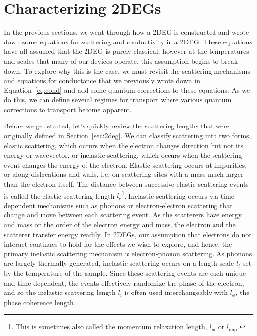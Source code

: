 \section{Characterizing 2DEGs}
\label{sec:char}
In the previous sections, we went through how a 2DEG is constructed and wrote down some equations for scattering
and conductivity in a 2DEG. These equations have all assumed that the 2DEG is purely classical; however at the temperatures
and scales that many of our devices operate, this assumption begins to break down. To explore why this is the case,
we must revisit the scattering mechanisms and equations for conductance that we previously wrote down in Equation~\ref{eq:cond}
and add some quantum corrections to these equations. As we do this, we can define several regimes for transport
where various quantum corrections to transport become apparent.

Before we get started, let's quickly review the scattering lengths that were originally defined in Section~\ref{sec:2deg}. We can classify
scattering into two forms, elastic scattering, which occurs when the electron changes direction but not its energy or wavevector, or
inelastic scattering, which occurs when the scattering event changes the energy of the electron. Elastic scattering occurs at impurities, or along dislocations
and walls, i.e. on scattering sites with a mass much larger than the electron itself. The distance between successive elastic scattering events is
called the elastic scattering length $l_e$\footnote{This is sometimes also called the momentum relaxation length, $l_m$ or $l_{\textrm{imp}}$.}.
Inelastic scattering occurs via time-dependent mechanisms such as phonons or electron-electron scattering that change and move between each scattering event.
As the scatterers have energy and mass on the order of the electron energy and mass, the electron and the scatterer transfer energy readily. In 2DEGs, our assumption that
electrons do not interact continues to hold for the effects we wish to explore, and hence, the primary inelastic scattering mechanism is electron-phonon scattering.
As phonons are largely thermally generated, inelastic scattering occurs on a length-scale $l_i$ set by the temperature of the sample. Since these scattering events
are each unique and time-dependent, the events effectively randomize the phase of the electron, and so
the inelastic scattering length $l_i$ is often used interchangeably with $l_\phi$, the phase coherence length.

